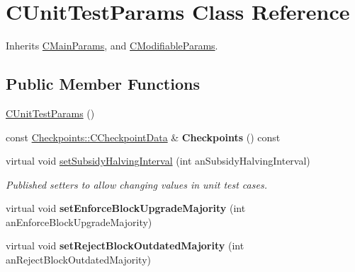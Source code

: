 \hypertarget{class_c_unit_test_params}{}\section{C\+Unit\+Test\+Params Class Reference}
\label{class_c_unit_test_params}


Inherits \mbox{\hyperlink{class_c_main_params}{C\+Main\+Params}}, and \mbox{\hyperlink{class_c_modifiable_params}{C\+Modifiable\+Params}}.

\subsection*{Public Member Functions}
\begin{DoxyCompactItemize}
\item 
\mbox{\hyperlink{class_c_unit_test_params_a851e71faf703b4e2f611083c79b7eb92}{C\+Unit\+Test\+Params}} ()
\item 
\mbox{\label{class_c_unit_test_params_a2ae5bc37269708082a6c95ad647d13d0}} 
const \mbox{\hyperlink{struct_checkpoints_1_1_c_checkpoint_data}{Checkpoints\+::\+C\+Checkpoint\+Data}} \& {\bfseries Checkpoints} () const
\item 
\mbox{\label{class_c_unit_test_params_ad4462df829bb0f363cd76ee337b9407f}} 
virtual void \mbox{\hyperlink{class_c_unit_test_params_ad4462df829bb0f363cd76ee337b9407f}{set\+Subsidy\+Halving\+Interval}} (int an\+Subsidy\+Halving\+Interval)
\begin{DoxyCompactList}\small\item\em Published setters to allow changing values in unit test cases. \end{DoxyCompactList}\item 
\mbox{\label{class_c_unit_test_params_aaee5cb62f06026178329b47a7b4f16fc}} 
virtual void {\bfseries set\+Enforce\+Block\+Upgrade\+Majority} (int an\+Enforce\+Block\+Upgrade\+Majority)
\item 
\mbox{\label{class_c_unit_test_params_a009dc59b829bd566236b90a543b648d3}} 
virtual void {\bfseries set\+Reject\+Block\+Outdated\+Majority} (int an\+Reject\+Block\+Outdated\+Majority)
\item 
\mbox{\label{class_c_unit_test_params_aca002db510d4642c4cd223aaa3180a61}} 

\end{DoxyCompactItemize}
